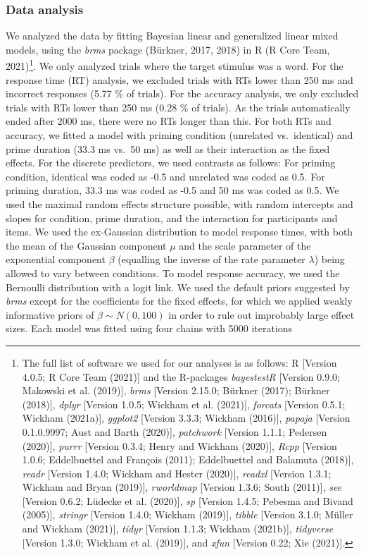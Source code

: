 \documentclass[
  english,
  man,floatsintext]{apa6}
\begin{document}
\hypertarget{data-analysis}{%
\subsubsection{Data analysis}\label{data-analysis}}

We analyzed the data by fitting Bayesian linear and generalized linear mixed models, using the \emph{brms} package (Bürkner, 2017, 2018) in R (R Core Team, 2021)\footnote{The full list of software we used for our analyses is as follows: R {[}Version 4.0.5; R Core Team (2021){]} and the R-packages \emph{bayestestR} {[}Version 0.9.0; Makowski et al. (2019){]}, \emph{brms} {[}Version 2.15.0; Bürkner (2017); Bürkner (2018){]}, \emph{dplyr} {[}Version 1.0.5; Wickham et al. (2021){]}, \emph{forcats} {[}Version 0.5.1; Wickham (2021a){]}, \emph{ggplot2} {[}Version 3.3.3; Wickham (2016){]}, \emph{papaja} {[}Version 0.1.0.9997; Aust and Barth (2020){]}, \emph{patchwork} {[}Version 1.1.1; Pedersen (2020){]}, \emph{purrr} {[}Version 0.3.4; Henry and Wickham (2020){]}, \emph{Rcpp} {[}Version 1.0.6; Eddelbuettel and François (2011); Eddelbuettel and Balamuta (2018){]}, \emph{readr} {[}Version 1.4.0; Wickham and Hester (2020){]}, \emph{readxl} {[}Version 1.3.1; Wickham and Bryan (2019){]}, \emph{rworldmap} {[}Version 1.3.6; South (2011){]}, \emph{see} {[}Version 0.6.2; Lüdecke et al. (2020){]}, \emph{sp} {[}Version 1.4.5; Pebesma and Bivand (2005){]}, \emph{stringr} {[}Version 1.4.0; Wickham (2019){]}, \emph{tibble} {[}Version 3.1.0; Müller and Wickham (2021){]}, \emph{tidyr} {[}Version 1.1.3; Wickham (2021b){]}, \emph{tidyverse} {[}Version 1.3.0; Wickham et al. (2019){]}, and \emph{xfun} {[}Version 0.22; Xie (2021){]}.}. We only analyzed trials where the target stimulus was a word. For the response time (RT) analysis, we excluded trials with RTs lower than 250 ms and incorrect responses (5.77 \% of trials). For the accuracy analysis, we only excluded trials with RTs lower than 250 ms (0.28 \% of trials). As the trials automatically ended after 2000 ms, there were no RTs longer than this. For both RTs and accuracy, we fitted a model with priming condition (unrelated vs.~identical) and prime duration (33.3 ms vs.~50 ms) as well as their interaction as the fixed effects. For the discrete predictors, we used contrasts as follows: For priming condition, identical was coded as -0.5 and unrelated was coded as 0.5. For priming duration, 33.3 ms was coded as -0.5 and 50 ms was coded as 0.5. We used the maximal random effects structure possible, with random intercepts and slopes for condition, prime duration, and the interaction for participants and items. We used the ex-Gaussian distribution to model response times, with both the mean of the Gaussian component \(\mu\) and the scale parameter of the exponential component \(\beta\) (equalling the inverse of the rate parameter \(\lambda\)) being allowed to vary between conditions. To model response accuracy, we used the Bernoulli distribution with a logit link. We used the default priors suggested by \emph{brms} except for the coefficients for the fixed effects, for which we applied weakly informative priors of \(\beta \sim N(0,100)\) in order to rule out improbably large effect sizes. Each model was fitted using four chains with 5000 iterations 
\end{document}
